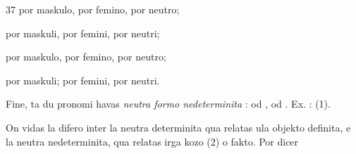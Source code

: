 \begin{VUpage}[41]{37}
\VUblanc{3.87pt}%
 por maskulo,  por femino,  por neutro;

 por maskuli,  por femini,  por neutri;

 por maskulo,  por femino,  por neutro;

 por maskuli;  por femini,  por neutri.

\VUblanc{3.80pt}%
Fine, ta du pronomi havas \textit{neutra formo nedeterminita} :\nl
{} od ,  od . Ex. : \nl
{}\nl
{} (1).

On vidas la difero inter la neutra determinita \nl
qua relatas ula objekto definita, e la neutra \nl
nedeterminita, qua relatas irga kozo (2) o fakto. Por dicer\cc
\end{VUpage}


